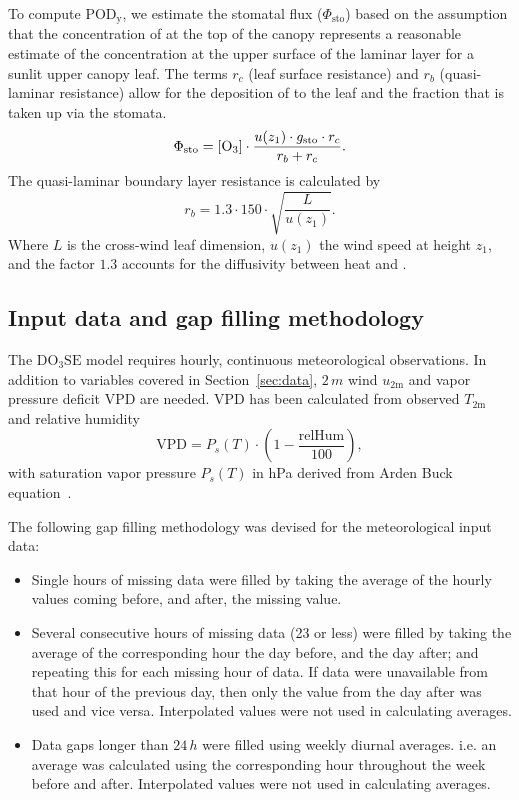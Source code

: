 \documentclass[bg, manuscript]{copernicus}
\begin{document}
To compute $\mathrm{POD_y}$, we estimate the stomatal  flux ($\Phi_\mathrm{sto}$) based on the assumption that the concentration of  at the top of the canopy represents a reasonable estimate of the concentration at the upper surface of the laminar layer for a sunlit upper canopy leaf. The terms $r_c$ (leaf surface resistance) and $r_b$ (quasi-laminar resistance) allow for the deposition of  to the leaf and the fraction that is taken up via the stomata. 
%
\begin{equation}
  \Phi_\mathrm{sto} = \chem{[O_3]} \cdot \frac{u(z_1) \cdot g_\mathrm{sto} \cdot r_c}{r_b + r_c}.
  \label{eq:flux_stomata}
\end{equation}
%
The quasi-laminar boundary layer resistance is calculated by
%
\begin{equation}
  r_b = 1.3 \cdot 150 \cdot \sqrt{\frac{L}{u(z_1)}}.
  \label{eq:quasi_laminar_resist}
\end{equation}
%
Where $L$ is the cross-wind leaf dimension, $u(z_1)$ the wind speed at height $z_1$, and the factor $1.3$ accounts for the diffusivity between heat and . 

\subsection{Input data and gap filling methodology}
\label{subsec:ozone_reco}
The $\mathrm{DO_3SE}$ model requires hourly, continuous meteorological observations. In addition to variables covered in Section~\ref{sec:data}, $2\,\unit{m}$ wind $u_\text{2m}$ and vapor pressure deficit VPD are needed. VPD has been calculated from observed $T_\text{2m}$ and relative humidity
\begin{equation}
  \text{VPD} = P_s(T) \cdot \left(1-\frac{\text{relHum}}{100}\right),
\end{equation}
with saturation vapor pressure $P_s(T)$ in \unit{hPa} derived from Arden Buck equation~\citep{JAP:Buck1981, Buck2012}.
  
The following gap filling methodology was devised for the meteorological input data:
\begin{itemize}
\item Single hours of missing data were filled by taking the average of the hourly values coming before, and after, the missing value.
\item Several consecutive hours of missing data (23 or less) were filled by taking the average of the corresponding hour the day before, and the day after; and repeating this for each missing hour of data. If data were unavailable from that hour of the previous day, then only the value from the day after was used and vice versa. Interpolated values were not used in calculating averages.
\item Data gaps longer than $24\,\unit{h}$ were filled using weekly diurnal averages. i.e. an average was calculated using the corresponding hour throughout the week before and after. Interpolated values were not used in calculating averages.
\end{itemize}
\end{document}
